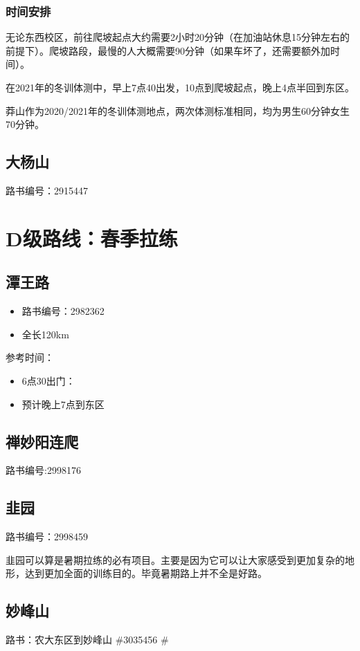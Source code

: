\documentclass{ctexbook}
\begin{document}
\subsubsection{时间安排}

无论东西校区，前往爬坡起点大约需要2小时20分钟（在加油站休息15分钟左右的前提下）。爬坡路段，最慢的人大概需要90分钟（如果车坏了，还需要额外加时间）。

在2021年的冬训体测中，早上7点40出发，10点到爬坡起点，晚上4点半回到东区。

莽山作为2020/2021年的冬训体测地点，两次体测标准相同，均为男生60分钟女生70分钟。

\newpage
\subsection{大杨山}
路书编号：2915447
\section{D级路线：春季拉练}
\subsection{潭王路}
\begin{itemize}
    \item 路书编号：2982362
    \item 全长120km
\end{itemize}
参考时间：
\begin{itemize}
    \item 6点30出门：
    \item 预计晚上7点到东区
\end{itemize}
\subsection{禅妙阳连爬}
路书编号:2998176
\subsection{韭园}
路书编号：2998459

韭园可以算是暑期拉练的必有项目。主要是因为它可以让大家感受到更加复杂的地形，达到更加全面的训练目的。毕竟暑期路上并不全是好路。


\subsection{妙峰山}
\label{subsec:妙峰山}
路书：农大东区到妙峰山 \#3035456  \#
\end{document}
